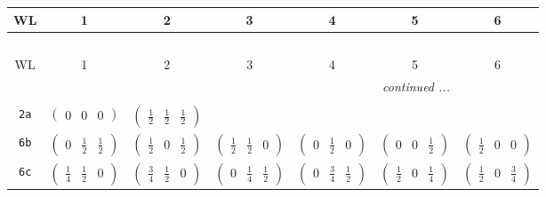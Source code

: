 \documentclass[fleqn,9pt,landscape]{jsarticle}
\begin{document}
\begin{center}
\renewcommand{\arraystretch}{1.2}
\begin{longtable}{ccccccc}
 \hline \hline
WL & 1 & 2 & 3 & 4 & 5 & 6 \\ \hline \endfirsthead

\multicolumn{6}{l}{\tablename\ \thetable{}} \\
 \hline \hline
WL & 1 & 2 & 3 & 4 & 5 & 6 \\ \hline \endhead

 \hline \hline
\multicolumn{6}{r}{\footnotesize\it continued ...} \\ \endfoot

 \hline \hline
\multicolumn{6}{r}{} \\ \endlastfoot

{\tt 2a} & $ \begin{pmatrix} 0 & 0 & 0 \end{pmatrix} $ & $ \begin{pmatrix} \frac{1}{2} & \frac{1}{2} & \frac{1}{2} \end{pmatrix} $ & $  $ & $  $ & $  $ & $  $ \\ \hline
{\tt 6b} & $ \begin{pmatrix} 0 & \frac{1}{2} & \frac{1}{2} \end{pmatrix} $ & $ \begin{pmatrix} \frac{1}{2} & 0 & \frac{1}{2} \end{pmatrix} $ & $ \begin{pmatrix} \frac{1}{2} & \frac{1}{2} & 0 \end{pmatrix} $ & $ \begin{pmatrix} 0 & \frac{1}{2} & 0 \end{pmatrix} $ & $ \begin{pmatrix} 0 & 0 & \frac{1}{2} \end{pmatrix} $ & $ \begin{pmatrix} \frac{1}{2} & 0 & 0 \end{pmatrix} $ \\ \hline
{\tt 6c} & $ \begin{pmatrix} \frac{1}{4} & \frac{1}{2} & 0 \end{pmatrix} $ & $ \begin{pmatrix} \frac{3}{4} & \frac{1}{2} & 0 \end{pmatrix} $ & $ \begin{pmatrix} 0 & \frac{1}{4} & \frac{1}{2} \end{pmatrix} $ & $ \begin{pmatrix} 0 & \frac{3}{4} & \frac{1}{2} \end{pmatrix} $ & $ \begin{pmatrix} \frac{1}{2} & 0 & \frac{1}{4} \end{pmatrix} $ & $ \begin{pmatrix} \frac{1}{2} & 0 & \frac{3}{4} \end{pmatrix} $ \\ \hline

\end{longtable}
\end{center}
\end{document}
